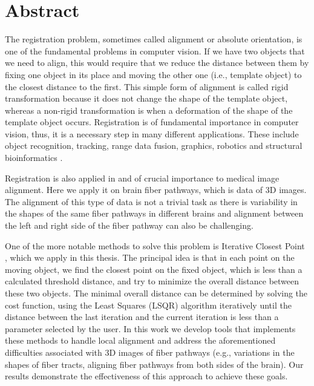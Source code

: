 \documentclass[../structure.tex]{subfiles}
\begin{document}
\chapter{Abstract}
The registration problem, sometimes called alignment or absolute orientation, is one of the fundamental problems in computer vision. If we have two objects that we need to align, this would require that we reduce the distance between them by fixing one object in its place and moving the other one (i.e., template object) to the closest distance to the first. This simple form of alignment is called rigid transformation because it does not change the shape of the template object, whereas a non-rigid transformation is when a deformation of the shape of the template object occurs. Registration is of fundamental importance in computer vision, thus, it is a necessary step in many different applications. These include object recognition, tracking, range data fusion, graphics, robotics and structural bioinformatics \cite{Li2007}.

Registration is also applied in and of crucial importance to medical image alignment. Here we apply it on brain fiber pathways, which is data of 3D images. The alignment of this type of data is not a trivial task as there is variability  in the shapes of the same fiber pathways in different brains and alignment between the left and right side of the fiber pathway can also be challenging.

One of the more notable methods to solve this problem is Iterative Closest Point , which we apply in this thesis. The principal idea is that in each point on the moving object, we find the closest point on the fixed object, which is less than a calculated threshold distance, and try to minimize the overall distance between these two objects. The minimal overall distance can be determined by solving the cost function, using the Least Squares (LSQR) algorithm iteratively until the distance between the last iteration and the current iteration is less than a parameter selected by the user. In this work we develop tools that implements these methods to handle local alignment and address the aforementioned difficulties associated with 3D images of fiber pathways (e.g., variations in the shapes of fiber tracts, aligning fiber pathways from both sides of the brain). Our results demonstrate the effectiveness of this approach to achieve these goals.
\end{document}

